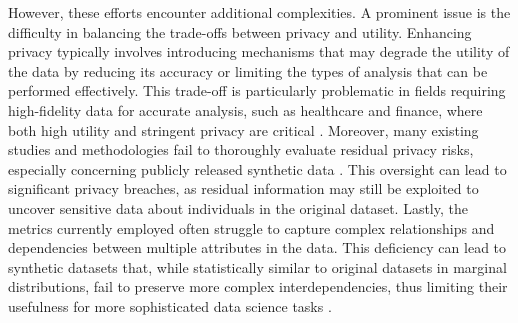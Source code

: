 \documentclass[11pt]{article}
\begin{document}
However, these efforts encounter additional complexities. A prominent issue is the difficulty in balancing the trade-offs between privacy and utility. Enhancing privacy typically involves introducing mechanisms that may degrade the utility of the data by reducing its accuracy or limiting the types of analysis that can be performed effectively. This trade-off is particularly problematic in fields requiring high-fidelity data for accurate analysis, such as healthcare and finance, where both high utility and stringent privacy are critical \parencite{mendelevitch_fidelity_2021,caliskan_comparative_2023}. Moreover, many existing studies and methodologies fail to thoroughly evaluate residual privacy risks, especially concerning publicly released synthetic data \parencite{kaabachi_scoping_2024}. This oversight can lead to significant privacy breaches, as residual information may still be exploited to uncover sensitive data about individuals in the original dataset. Lastly, the metrics currently employed often struggle to capture complex relationships and dependencies between multiple attributes in the data. This deficiency can lead to synthetic datasets that, while statistically similar to original datasets in marginal distributions, fail to preserve more complex interdependencies, thus limiting their usefulness for more sophisticated data science tasks \parencite{jordon_synthetic_2022}.
\end{document}
